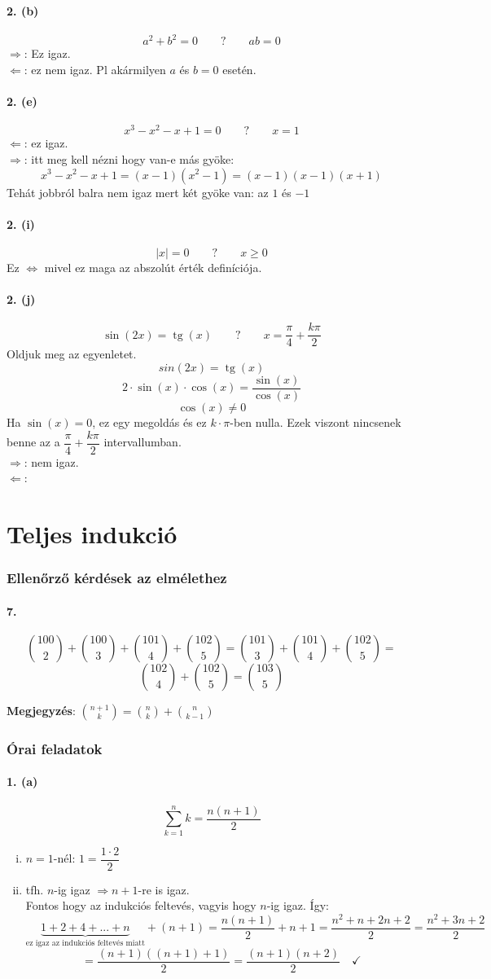 \documentclass[12pt,a4paper,fleqn]{article}
\newcommand{\myparagraph}[1]{\paragraph{#1}\mbox{}}
\DeclareMathOperator{\tg}{tg}
\begin{document}
\myparagraph{2. (b)}
\[ a^2+b^2=0 \qquad ? \qquad ab=0 \]
$\Rightarrow$: Ez igaz. \\
$\Leftarrow$: ez nem igaz. Pl akármilyen $a$ és $b=0$ esetén.


\myparagraph{2. (e)}
\[ x^3 - x^2 - x + 1 = 0 \qquad ? \qquad x = 1 \]
$\Leftarrow$: ez igaz. \\
$\Rightarrow$: itt meg kell nézni hogy van-e más gyöke:
\[ x^3 - x^2 - x + 1 = (x-1)(x^2-1) = (x-1)(x-1)(x+1) \]
Tehát jobbról balra nem igaz mert két gyöke van: az $1$ és $-1$

\myparagraph{2. (i)}
\[ |x|=0 \qquad ? \qquad x \geq 0 \]
Ez $\iff$ mivel ez maga az abszolút érték definíciója.

\myparagraph{2. (j)}
\[ \sin(2x) = \tg(x) \qquad ? \qquad x = \dfrac{\pi}{4} + \dfrac{k\pi}{2} \]
Oldjuk meg az egyenletet.
\[ sin(2x) = \tg(x) \]
\[ 2 \cdot \sin(x) \cdot \cos(x) = \dfrac{\sin(x)}{\cos(x)} \]
\[ \cos(x) \neq 0 \]
Ha $\sin(x) = 0$, ez egy megoldás és ez $k \cdot \pi$-ben nulla. Ezek viszont
nincsenek benne az a $\dfrac{\pi}{4} + \dfrac{k\pi}{2}$ intervallumban. \\
$\Rightarrow$: nem igaz. \\
$\Leftarrow$:


\clearpage
\section{Teljes indukció}
\setcounter{subsection}{1}
\subsubsection{Ellenőrző kérdések az elmélethez}

\myparagraph{7.}
\[ \binom{100}{2} + \binom{100}{3} + \binom{101}{4} + \binom{102}{5} =
  \binom{101}{3} + \binom{101}{4} + \binom{102}{5} = \]
\[ \binom{102}{4} + \binom{102}{5} = \binom{103}{5} \]
\begin{flushright}
  \textbf{Megjegyzés}: $\binom{n+1}{k} = \binom{n}{k} + \binom{n}{k-1}$
\end{flushright}

\subsubsection{Órai feladatok}

\myparagraph{1. (a)}
\[ \sum_{k=1}^{n} k = \dfrac{n(n+1)}{2}\]
\begin{enumerate}[i.]
  \item $n=1$-nél: $ 1 = \dfrac{1 \cdot 2}{2} $ \checkmark
  \item tfh. $n$-ig igaz $\Rightarrow n+1$-re is igaz. \\
  Fontos hogy az indukciós feltevés, vagyis hogy $n$-ig igaz. Így:
  \[ \underbrace{1+2+4+...+n}_{\text{ez igaz az indukciós feltevés miatt}}
    + (n+1) = \dfrac{n(n+1)}{2} + n + 1 = \dfrac{n^2+n+2n+2}{2} =
    \dfrac{n^2+3n+2}{2} \]
  \[ = \dfrac{(n+1)((n+1) + 1)}{2} = \dfrac{(n+1)(n+2)}{2} \quad \checkmark \]
\end{enumerate}
\end{document}
